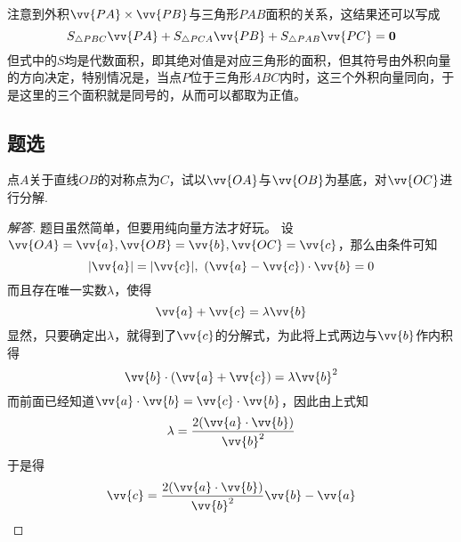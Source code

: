 \begin{example}
  注意到外积$\vv{PA}\times\vv{PB}$与三角形$PAB$面积的关系，这结果还可以写成
  \[ S_{\triangle PBC} \vv{PA} + S_{\triangle PCA} \vv{PB} + S_{\triangle PAB} \vv{PC} = \bm{0} \]
  但式中的$S$均是代数面积，即其绝对值是对应三角形的面积，但其符号由外积向量的方向决定，特别情况是，当点$P$位于三角形$ABC$内时，这三个外积向量同向，于是这里的三个面积就是同号的，从而可以都取为正值。
\end{example}

\subsection{题选}
\label{sec:题选}

\begin{exercise}
  点$A$关于直线$OB$的对称点为$C$，试以$\vv{OA}$与$\vv{OB}$为基底，对$\vv{OC}$进行分解.
\end{exercise}



\begin{proof}[解答]
  题目虽然简单，但要用纯向量方法才好玩。
设$\vv{OA}=\vv{a},\vv{OB}=\vv{b},\vv{OC}=\vv{c}$，那么由条件可知
\[ |\vv{a}|=|\vv{c}|, \  (\vv{a}-\vv{c}) \cdot \vv{b}=0 \]
而且存在唯一实数$\lambda$，使得
\[ \vv{a}+\vv{c}=\lambda \vv{b} \]
显然，只要确定出$\lambda$，就得到了$\vv{c}$的分解式，为此将上式两边与$\vv{b}$作内积得
\[ \vv{b} \cdot (\vv{a}+\vv{c})=\lambda \vv{b}^2 \]
而前面已经知道$\vv{a} \cdot \vv{b}=\vv{c} \cdot \vv{b}$，因此由上式知
\[ \lambda = \frac{2(\vv{a} \cdot \vv{b})}{\vv{b}^2} \]
于是得
\[ \vv{c} = \frac{2(\vv{a} \cdot \vv{b})}{\vv{b}^2} \vv{b} - \vv{a} \]
\end{proof}

